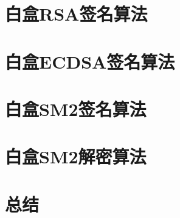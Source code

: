 \documentclass[UTF8]{ctexbook}
\begin{document}
\chapter{白盒RSA签名算法}

\chapter{白盒ECDSA签名算法}

\chapter{白盒SM2签名算法}

\chapter{白盒SM2解密算法}

\chapter{总结}
\label{chapter:conclusion}
%



%

\appendix
%
\end{document}
